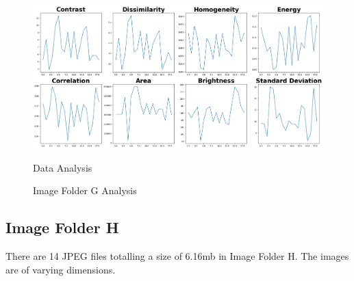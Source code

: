 \begin{figure}[ht]
\begin{minipage}[t]{0.50\textwidth}
        \centering
        \includegraphics[width=\textwidth]{Figures/EDA_Charts/9/da.png}
        \caption*{Data Analysis}
    \end{minipage}
    \caption{Image Folder G Analysis}
    \label{fig:Image Folder G Analysis}
\end{figure}

\subsection{Image Folder H}

There are 14 JPEG files totalling a size of 6.16mb in Image Folder H. The images are of varying dimensions.

